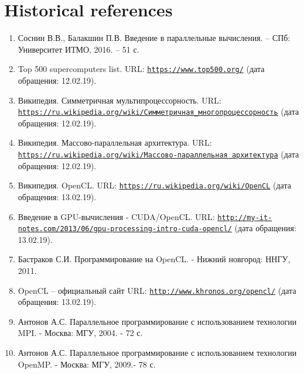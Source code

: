 { %
\section*{Historical references}
	\begin{enumerate}
		\sloppy
		\item Соснин В.В., Балакшин П.В. Введение в параллельные вычисления. – СПб: Университет ИТМО, 2016. – 51 с.
		\item Top 500 supercomputers list. URL: \href{https://www.top500.org/}{\nolinkurl{https://www.top500.org/}} (дата обращения: 12.02.19).
		\item Википедия. Симметричная мультипроцессорность. URL: \href{https://ru.wikipedia.org/wiki/%D0%A1%D0%B8%D0%BC%D0%BC%D0%B5%D1%82%D1%80%D0%B8%D1%87%D0%BD%D0%B0%D1%8F_%D0%BC%D0%BD%D0%BE%D0%B3%D0%BE%D0%BF%D1%80%D0%BE%D1%86%D0%B5%D1%81%D1%81%D0%BE%D1%80%D0%BD%D0%BE%D1%81%D1%82%D1%8C}{\nolinkurl{https://ru.wikipedia.org/wiki/Симметричная_многопроцессорность}} (дата обращения: 12.02.19).
		\item Википедия. Массово-параллельная архитектура. URL: \href{https://ru.wikipedia.org/wiki/%D0%9C%D0%B0%D1%81%D1%81%D0%BE%D0%B2%D0%BE-%D0%BF%D0%B0%D1%80%D0%B0%D0%BB%D0%BB%D0%B5%D0%BB%D1%8C%D0%BD%D0%B0%D1%8F_%D0%B0%D1%80%D1%85%D0%B8%D1%82%D0%B5%D0%BA%D1%82%D1%83%D1%80%D0%B0}{\nolinkurl{https://ru.wikipedia.org/wiki/Массово-параллельная архитектура}} (дата обращения: 12.02.19).
		\item Википедия. OpenCL. URL: \href{https://ru.wikipedia.org/wiki/OpenCL}{\nolinkurl{https://ru.wikipedia.org/wiki/OpenCL}} (дата обращения: 13.02.19).
		\item Введение в GPU-вычисления - CUDA/OpenCL. URL: \href{http://my-it-notes.com/2013/06/gpu-processing-intro-cuda-opencl/}{\nolinkurl{http://my-it-notes.com/2013/06/gpu-processing-intro-cuda-opencl/}} (дата обращения: 13.02.19).
		\item Бастраков С.И. Программирование на OpenCL. - Нижний новгород: ННГУ, 2011.
		\item OpenCL – официальный сайт URL: \href{http://www.khronos.org/opencl/}{\nolinkurl{http://www.khronos.org/opencl/}} (дата обращения: 13.02.19).
		\item Антонов А.С. Параллельное программирование с использованием технологии MPI. - Москва: МГУ, 2004. - 72 с.
		\item Антонов А.С. Параллельное программирование с использованием технологии OpenMP. - Москва: МГУ, 2009.- 78 с.

\end{enumerate}}
